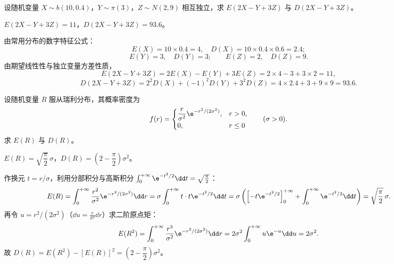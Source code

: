 \begin{exercise}
设随机变量 $X\sim b(10,0.4)$，$Y\sim\pi(3)$，$Z\sim N(2,9)$ 相互独立，求 $E(2X-Y+3Z)$ 与 $D(2X-Y+3Z)$。
\begin{answer}
$E(2X-Y+3Z)=11$，$D(2X-Y+3Z)=93.6$。
\end{answer}
\begin{solution}
由常用分布的数字特征公式：
\[
  E(X)=10\times 0.4=4,\quad D(X)=10\times 0.4\times 0.6=2.4;
\]
\[
  E(Y)=3,\quad D(Y)=3;\qquad E(Z)=2,\quad D(Z)=9.
\]
由期望线性性与独立变量方差性质，
\[
  E(2X-Y+3Z)=2E(X)-E(Y)+3E(Z)=2\times 4-3+3\times 2=11,
\]
\[
  D(2X-Y+3Z)=2^2 D(X)+(-1)^2 D(Y)+3^2 D(Z)=4\times 2.4+3+9\times 9=93.6.
\]
\end{solution}
\end{exercise}

\begin{exercise}
设随机变量 $R$ 服从瑞利分布，其概率密度为
\[
  f(r)=
  \begin{cases}
    \dfrac{r}{\sigma^2}\e^{-r^2/(2\sigma^2)},& r>0,\\
    0,& r\le 0
  \end{cases}
  \qquad(\sigma>0).
\]
求 $E(R)$ 与 $D(R)$。
\begin{answer}
$E(R)=\sqrt{\dfrac{\pi}{2}}\,\sigma$，$D(R)=\left(2-\dfrac{\pi}{2}\right)\sigma^2$。
\end{answer}
\begin{solution}
作换元 $t=r/\sigma$，利用分部积分与高斯积分 $\int_{0}^{+\infty}\e^{-t^2/2}\dd t=\sqrt{\frac{\pi}{2}}$：
\[
  E(R)=\int_{0}^{+\infty}\frac{r^2}{\sigma^2}\e^{-r^2/(2\sigma^2)}\dd r
  =\sigma\int_{0}^{+\infty}t\cdot t\e^{-t^2/2}\dd t
  =\sigma\left(\Bigl[-t\e^{-t^2/2}\Bigr]_{0}^{+\infty}+\int_{0}^{+\infty}\e^{-t^2/2}\dd t\right)
  =\sqrt{\frac{\pi}{2}}\,\sigma.
\]
再令 $u=r^2/(2\sigma^2)$（$\dd u=\frac{r}{\sigma^2}\dd r$）求二阶原点矩：
\[
  E(R^2)=\int_{0}^{+\infty}\frac{r^3}{\sigma^2}\e^{-r^2/(2\sigma^2)}\dd r
  =2\sigma^2\int_{0}^{+\infty}u\e^{-u}\dd u=2\sigma^2.
\]
故 $D(R)=E(R^2)-[E(R)]^2=\left(2-\dfrac{\pi}{2}\right)\sigma^2$。
\end{solution}
\end{exercise}

